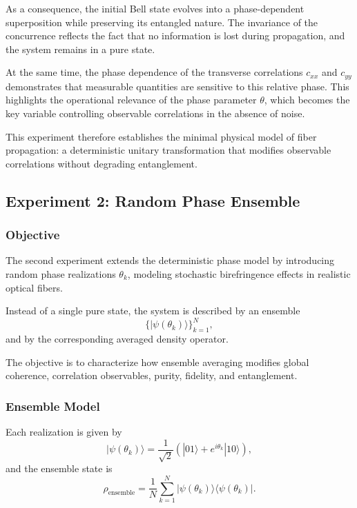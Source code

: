 \documentclass[a4paper]{article}
\begin{document}
As a consequence, the initial Bell state evolves into a phase-dependent superposition while preserving its entangled nature. The invariance of the concurrence reflects the fact that no information is lost during propagation, and the system remains in a pure state.

At the same time, the phase dependence of the transverse correlations \(c_{xx}\) and \(c_{yy}\) demonstrates that measurable quantities are sensitive to this relative phase. This highlights the operational relevance of the phase parameter \(\theta\), which becomes the key variable controlling observable correlations in the absence of noise.

This experiment therefore establishes the minimal physical model of fiber propagation: a deterministic unitary transformation that modifies observable correlations without degrading entanglement.
\subsection{Experiment 2: Random Phase Ensemble}

\subsubsection{Objective}

The second experiment extends the deterministic phase model by introducing random phase realizations \(\theta_k\), modeling stochastic birefringence effects in realistic optical fibers.

Instead of a single pure state, the system is described by an ensemble
\[
\{ |\psi(\theta_k)\rangle \}_{k=1}^{N},
\]
and by the corresponding averaged density operator.

The objective is to characterize how ensemble averaging modifies global coherence, correlation observables, purity, fidelity, and entanglement.

\subsubsection{Ensemble Model}

Each realization is given by
\[
|\psi(\theta_k)\rangle
=
\frac{1}{\sqrt{2}}
\left(
|01\rangle + e^{i\theta_k}|10\rangle
\right),
\]
and the ensemble state is
\[
\rho_{\mathrm{ensemble}}
=
\frac{1}{N}
\sum_{k=1}^{N}
|\psi(\theta_k)\rangle\langle \psi(\theta_k)|.
\]
\end{document}
